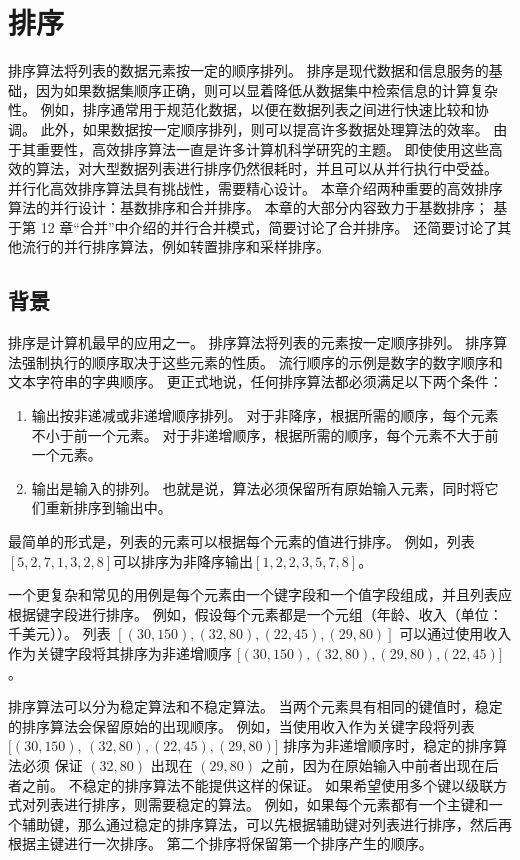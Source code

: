 \section{排序}
排序算法将列表的数据元素按一定的顺序排列。 排序是现代数据和信息服务的基础，因为如果数据集顺序正确，则可以显着降低从数据集中检索信息的计算复杂性。 例如，排序通常用于规范化数据，以便在数据列表之间进行快速比较和协调。 此外，如果数据按一定顺序排列，则可以提高许多数据处理算法的效率。 由于其重要性，高效排序算法一直是许多计算机科学研究的主题。 即使使用这些高效的算法，对大型数据列表进行排序仍然很耗时，并且可以从并行执行中受益。 并行化高效排序算法具有挑战性，需要精心设计。 本章介绍两种重要的高效排序算法的并行设计：基数排序和合并排序。 本章的大部分内容致力于基数排序； 基于第 12 章“合并”中介绍的并行合并模式，简要讨论了合并排序。 还简要讨论了其他流行的并行排序算法，例如转置排序和采样排序。

\subsection{背景}
排序是计算机最早的应用之一。 排序算法将列表的元素按一定顺序排列。 排序算法强制执行的顺序取决于这些元素的性质。 流行顺序的示例是数字的数字顺序和文本字符串的字典顺序。 更正式地说，任何排序算法都必须满足以下两个条件：
\begin{enumerate}
   \item 输出按非递减或非递增顺序排列。 对于非降序，根据所需的顺序，每个元素不小于前一个元素。 对于非递增顺序，根据所需的顺序，每个元素不大于前一个元素。

   \item 输出是输入的排列。 也就是说，算法必须保留所有原始输入元素，同时将它们重新排序到输出中。
\end{enumerate}

最简单的形式是，列表的元素可以根据每个元素的值进行排序。 例如，列表$[5,2,7,1,3,2,8]$可以排序为非降序输出$[1,2,2,3,5,7,8]$。

一个更复杂和常见的用例是每个元素由一个键字段和一个值字段组成，并且列表应根据键字段进行排序。 例如，假设每个元素都是一个元组（年龄、收入（单位：千美元））。 列表 $[(30,150),(32,80),(22,45),(29,80)]$ 可以通过使用收入作为关键字段将其排序为非递增顺序 $[(30,150),(32 ,80),(29,80)$,$(22,45)]$。

排序算法可以分为稳定算法和不稳定算法。 当两个元素具有相同的键值时，稳定的排序算法会保留原始的出现顺序。 例如，当使用收入作为关键字段将列表 $[(30,150)$, $(32,80),(22,45),(29,80)]$ 排序为非递增顺序时，稳定的排序算法必须 保证 $(32,80)$ 出现在 $(29,80)$ 之前，因为在原始输入中前者出现在后者之前。 不稳定的排序算法不能提供这样的保证。 如果希望使用多个键以级联方式对列表进行排序，则需要稳定的算法。 例如，如果每个元素都有一个主键和一个辅助键，那么通过稳定的排序算法，可以先根据辅助键对列表进行排序，然后再根据主键进行一次排序。 第二个排序将保留第一个排序产生的顺序。

